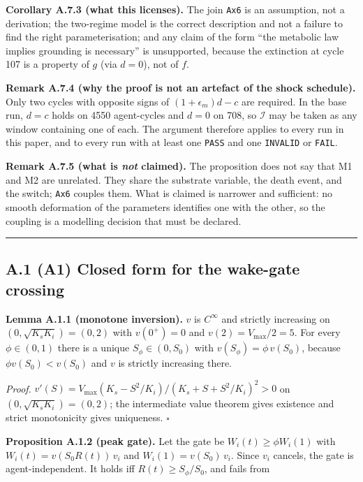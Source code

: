 \documentclass[11pt,a4paper]{article}
\begin{document}
\textbf{Corollary A.7.3 (what this licenses).} The join \texttt{Ax6} is an assumption, not a
derivation; the two-regime model is the correct description and not a failure to
find the right parameterisation; and any claim of the form ``the metabolic law
implies grounding is necessary'' is unsupported, because the extinction at cycle
107 is a property of \(g\) (via \(d=0\)), not of \(f\).

\textbf{Remark A.7.4 (why the proof is not an artefact of the shock schedule).} Only
two cycles with opposite signs of \((1+\epsilon_m)d-c\) are required. In the base
run, \(d=c\) holds on 4550 agent-cycles and \(d=0\) on 708, so \(\mathcal{I}\) may be
taken as any window containing one of each. The argument therefore applies to
every run in this paper, and to every run with at least one \texttt{PASS} and one
\texttt{INVALID} or \texttt{FAIL}.

\textbf{Remark A.7.5 (what is \emph{not} claimed).} The proposition does not say that M1 and
M2 are unrelated. They share the substrate variable, the death event, and the
switch; \texttt{Ax6} couples them. What is claimed is narrower and sufficient: no smooth
deformation of the parameters identifies one with the other, so the coupling is a
modelling decision that must be declared.

\begin{center}\rule{0.5\linewidth}{0.5pt}\end{center}

\subsection{A.1 (A1) Closed form for the wake-gate crossing}\label{a.1-a1-closed-form-for-the-wake-gate-crossing}

\textbf{Lemma A.1.1 (monotone inversion).} \(v\) is \(C^\infty\) and strictly increasing on
\((0,\sqrt{K_sK_i})=(0,2)\) with \(v(0^+)=0\) and \(v(2)=V_{\max}/2=5\). For every
\(\phi\in(0,1)\) there is a unique \(S_\phi\in(0,S_0)\) with \(v(S_\phi)=\phi\,v(S_0)\),
because \(\phi v(S_0)<v(S_0)\) and \(v\) is strictly increasing there.

\emph{Proof.} \(v'(S)=V_{\max}(K_s-S^2/K_i)/(K_s+S+S^2/K_i)^2>0\) on
\((0,\sqrt{K_sK_i})=(0,2)\); the intermediate value theorem gives existence and
strict monotonicity gives uniqueness. \(\square\)

\textbf{Proposition A.1.2 (peak gate).} Let the gate be \(W_i(t)\ge\phi W_i(1)\) with
\(W_i(t)=v(S_0R(t))\,v_i\) and \(W_i(1)=v(S_0)\,v_i\). Since \(v_i\) cancels, the gate is
agent-independent. It holds iff \(R(t)\ge S_\phi/S_0\), and fails from
\end{document}
